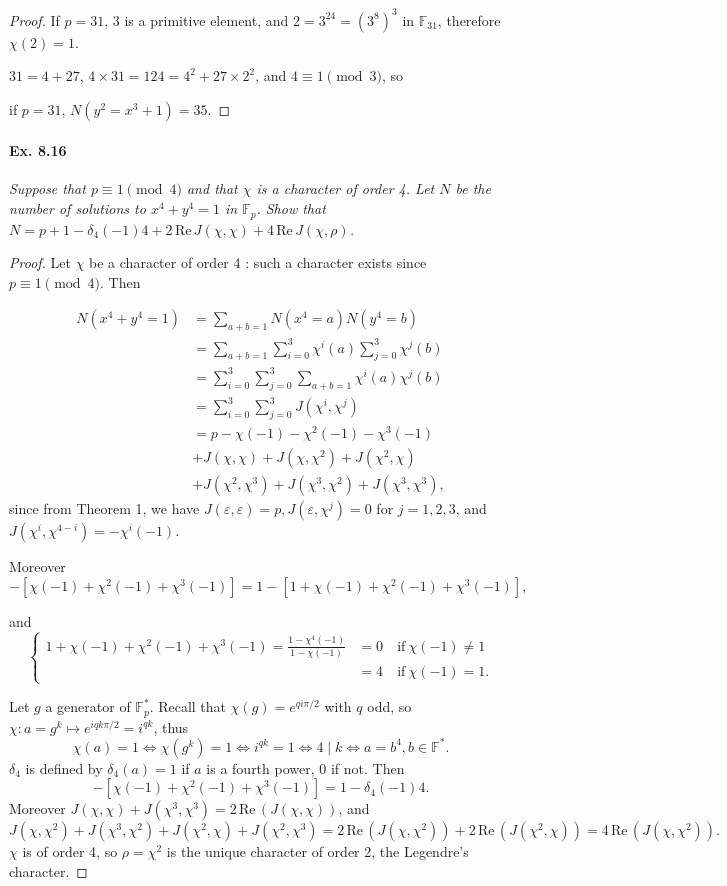 \documentclass[11pt,a4paper]{article}
\newcommand{\F}{\mathbb{F}}
\begin{document}
{\begin{proof}
If $p=31$, 3 is a primitive element, and $2 = 3^{24} = (3^8)^3$ in $\F_{31}$, therefore $\chi(2)=1$.

$31 = 4 + 27$, $4\times31 = 124 = 4^2+27\times2^2$, and $4\equiv 1 \pmod 3$, so

if $p=31$, $N(y^2 = x^3+1) = 35$.
\end{proof}

\paragraph{Ex. 8.16}

{\it Suppose that $p\equiv 1 \pmod 4$ and that $\chi$ is a character of order 4. Let $N$ be the number of solutions to $x^4+y^4 = 1$ in $\F_p$. Show that $N = p+1-\delta_4(-1) 4 + 2\, \mathrm{Re}\, J(\chi,\chi) + 4 \, \mathrm{Re}\, J(\chi,\rho)$.
}

\begin{proof}
Let $\chi$ be a character of order 4 : such a character exists since $p\equiv 1 \pmod 4$. Then

\begin{align*}
N(x^4+y^4=1) &=\sum\limits_{a+b=1} N(x^4=a)N(y^4=b)\\
&=\sum\limits_{a+b=1} \sum\limits_{i=0}^3 \chi^i(a) \sum\limits_{j=0}^3 \chi^j(b)\\
&= \sum\limits_{i=0}^3 \sum\limits_{j=0}^3\sum\limits_{a+b=1} \chi^i(a)  \chi^j(b)\\
&= \sum\limits_{i=0}^3 \sum\limits_{j=0}^3 J(\chi^i,\chi^j)\\
&= p-\chi(-1)-\chi^2(-1) - \chi^3(-1) \\
&+ J(\chi,\chi) + J(\chi,\chi^2) +J(\chi^2,\chi)\\
&+J(\chi^2,\chi^3)+J(\chi^3,\chi^2)+J(\chi^3,\chi^3),
\end{align*}
since from Theorem 1, we have $J(\varepsilon,\varepsilon) = p, J(\varepsilon,\chi^j) = 0$ for $j = 1,2,3$, and $J(\chi^i, \chi^{4-i}) = -\chi^i(-1)$.

Moreover
 $$-[\chi(-1)+\chi^2(-1)+\chi^3(-1)] = 1-[1+\chi(-1)+\chi^2(-1)+\chi^3(-1)],$$
 
 and
 $$
\left\{
\begin{array}{ccll}
  1+\chi(-1)+\chi^2(-1)+\chi^3(-1) = \frac{1-\chi^4(-1)}{1-\chi(-1)} & = 0&\ \mathrm{if}\ \chi(-1) \neq 1    \\
  &     =4&\ \mathrm{if}\ \chi(-1) =1.
\end{array}
\right.
$$

 Let $g$ a generator of $\F_p^*$. Recall that  $\chi(g) = e^{qi\pi/2}$ with $q$ odd, so $\chi : a = g^k \mapsto e^{i qk\pi /2} = i^{qk}$, thus
 $$\chi(a) = 1 \iff \chi(g^k)=1 \iff  i^{qk} = 1 \iff 4 \mid k \iff a = b^4, b \in \F^*.$$
 $\delta_4$ is defined by  $\delta_4(a) = 1$ if $a$ is a fourth power, 0 if not. Then  
 $$-[\chi(-1)+\chi^2(-1)+\chi^3(-1)] = 1 - \delta_4(-1)4.$$
 Moreover $J(\chi,\chi)+ J(\chi^3,\chi^3) = 2 \,\mathrm{Re}\,( J (\chi,\chi))$, and
 $$J(\chi,\chi^2)+J(\chi^3,\chi^2) + J(\chi^2,\chi)+J(\chi^2,\chi^3) = 2 \,\mathrm{Re}\,(J(\chi,\chi^2)) + 2\,\mathrm{Re}\,(J(\chi^2,\chi))= 4\,\mathrm{Re}\,(J(\chi,\chi^2)).$$
$\chi$ is of order 4, so $\rho = \chi^2$ is the unique character of order 2, the Legendre's character.


\end{proof}}
\end{document}
